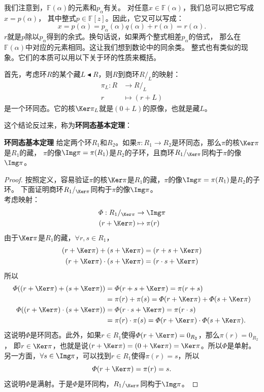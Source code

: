 \documentclass[12pt,UTF8,fontset=none]{ctexbook}
\begin{document}
\begin{appendix}
我们注意到，$\mathbb{F}(\alpha)$的元素和$p_\alpha$有关。
对任意$x \in \mathbb{F}(\alpha)$，我们总可以把它写成$x = p(\alpha)$，
其中整式$p \in\mathbb{F}[z]$。因此，它又可以写成：
$$ x = p(\alpha) = p_\alpha(\alpha)q(\alpha) + r(\alpha) = r(\alpha).$$
$r$就是$p$除以$p_\alpha$得到的余式。换句话说，如果两个整式相差$p_\alpha$的倍式，
那么在$\mathbb{F}(\alpha)$中对应的元素相同。这让我们想到数论中的同余类。
整式也有类似的现象。它们的本质可以用以下关于环的性质来概括。

首先，考虑环$R$的某个藏$L \blacktriangleleft R$，则$R$到商环$R /_L$的映射：
\begin{align*}
    \pi_L : R &\rightarrow R /_L  \\
    r &\mapsto (r + L) 
\end{align*}
是一个环同态。它的核$\Ker \pi_L$就是$(0 + L)$的原像，也就是藏$L$。

这个结论反过来，称为\textbf{环同态基本定理}：
\begin{pp}\textbf{环同态基本定理 }\label{pp:9_1}
    给定两个环$R_1$和$R_2$。如果$\pi: R_1 \rightarrow R_2$是环同态，那么$\pi$的核$\Ker \pi$是$R_1$的藏，
    $\pi$的像$\Img \pi = \pi (R_1)$是$R_2$的子环，且商环$R_1/_{\Ker \pi}$同构于$\pi$的像$\Img \pi$。
\end{pp}
\begin{proof} %
    按照定义，容易验证$\pi$的核$\Ker \pi$是$R_1$的藏，$\pi$的像$\Img \pi = \pi (R_1)$是$R_2$的子环。
    下面证明商环$R_1/_{\Ker \pi}$同构于$\pi$的像$\Img \pi$。\\
    考虑映射：
    \begin{align*}
        \varPhi : R_1/_{\Ker \pi} &\rightarrow \Img \pi  \\
        (r + \Ker \pi) &\mapsto \pi(r)  
    \end{align*}
    由于$\Ker \pi$是$R_1$的藏，$\forall r, s \in R_1$，
    \begin{align*}
        (r + \Ker \pi) + (s + \Ker \pi) &= (r + s + \Ker \pi)  \\
        (r + \Ker \pi) \cdot (s + \Ker \pi) &= (r \cdot s + \Ker \pi)  
    \end{align*}
    所以
    \begin{align*}
        \varPhi((r + \Ker \pi) + (s + \Ker \pi)) &= \varPhi(r + s + \Ker \pi) = \pi(r + s)   \\
        &= \pi(r) + \pi (s) = \varPhi(r + \Ker \pi) + \varPhi(s + \Ker \pi)  \\
        \varPhi((r + \Ker \pi) \cdot (s + \Ker \pi)) &= \varPhi(r \cdot s + \Ker \pi) = \pi(r \cdot s)   \\
        &= \pi(r) \cdot \pi (s) = \varPhi(r + \Ker \pi) \cdot \varPhi(s + \Ker \pi).  
    \end{align*}
    这说明$\varPhi$是环同态。此外，如果$r \in R_1$使得$\varPhi(r + \Ker \pi) = 0_{R_2}$，那么$\pi(r) = 0_{R_2}$，
    即$r \in \Ker \pi$，也就是说$(r + \Ker \pi) = (0 + \Ker \pi) = \Ker \pi$。所以$\varPhi$是单射。\\
    另一方面，$\forall s \in \Img \pi$，可以找到$r \in R_1$使得$\pi(r) = s$，所以
    $$ \varPhi(r + \Ker \pi) = \pi(r) = s.$$
    这说明$\varPhi$是满射。于是$\varPhi$是环同构，$R_1/_{\Ker \pi}$同构于$\Img \pi$。
    

\end{proof}
\end{appendix}
\end{document}
